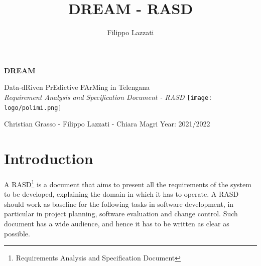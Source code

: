 \documentclass{article}
\title{DREAM - RASD}
\author{Filippo Lazzati}
\begin{document}
\thispagestyle{empty} 
\begin{titlepage}
    \begin{center}
       {\Huge \textbf{DREAM}} %
       \vspace{0.5cm}
       \\
    \begin{LARGE}
        {Data-dRiven PrEdictive FArMing in Telengana}
        \vspace{1.0cm}
        \\
        {\textit{Requirement Analysis and Specification Document - RASD}}
        \texttt{[image: logo/polimi.png]}
       \vspace{1.5cm}
        
        {Christian Grasso - Filippo Lazzati - Chiara Magri}
       \vspace{0.5cm}
       {Year: 2021/2022}
       
    \end{LARGE}  
   \end{center}
\end{titlepage}
\newpage
\tableofcontents %
\newpage
\section{Introduction}
A RASD\footnote{Requirements Analysis and Specification
Document} is a document that aims to present all the requirements of the system to be developed, explaining the 
domain in which it has to operate. A RASD should work as baseline for the following tasks in software development,
in particular in project planning, software evaluation and change control. Such document has a wide audience, and hence it has to
be written as clear as possible.
\end{document}
